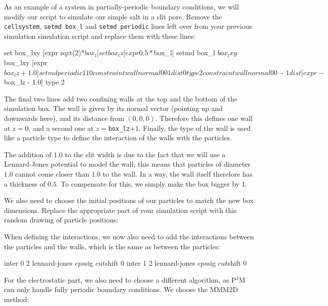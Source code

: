 \documentclass[
a4paper,                        %
11pt,                           %
twoside,                        %
footsepline,                    %
headsepline,                    %
headexclude,                    %
footexclude,                    %
pagesize,                       %
]{scrartcl}
\begin{document}
As an example of a system in partially-periodic boundary conditions,
we will modify our script to simulate our simple salt in a slit pore.
Remove the \verb|cellsystem|, \verb|setmd box_l| and \verb|setmd periodic| lines left
over from your previous simulation simulation script and replace them
with these lines:

\begin{tclcode}
  set box_lxy [expr sqrt(2)*$box_l]
  set box_lz  [expr 0.5*$box_l]
  setmd box_l $box_lxy $box_lxy [expr $box_lz + 1.0]
  setmd periodic 1 1 0
  constraint wall normal 0 0  1 dist 0 type 2
  constraint wall normal 0 0 -1 dist [expr -$box_lz - 1.0] type 2
\end{tclcode}

The final two lines add two confining walls at the top
and the bottom of the simulation box. The wall is given by its normal
vector (pointing up and downwards here), and its distance from
$(0,0,0)$. Therefore this defines one wall at $z=0$, and a second
one at $z=$\verb|box_lz|$+1$. Finally, the type of the wall is used like a
particle type to define the interaction of the walls with the particles.

The addition of $1.0$ to the slit width is due to the fact that we will
use a Lennard-Jones potential to model the wall; this means that
particles of diameter $1.0$ cannot come closer than $1.0$ to the wall. In a
way, the wall itself therefore has a thickness of $0.5$. To compensate
for this, we simply make the box bigger by 1.

We also need to choose the initial positions of our particles to match
the new box dimensions. Replace the appropriate part of your
simulation script with this random drawing of particle positions:


When defining the interactions, we now also need to add the
interactions between the particles and the walls, which is the same as
between the particles:

\begin{tclcode}
  inter 0 2 lennard-jones $eps $sig $cut $shift 0
  inter 1 2 lennard-jones $eps $sig $cut $shift 0
\end{tclcode}

For the electrostatic part, we also need to choose a different algorithm,
as P$^3$M can only handle fully periodic boundary conditions. We
choose the MMM2D method:
\end{document}
